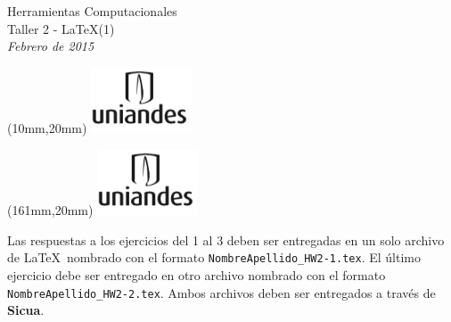 \documentclass[12pt,letterpaper]{exam}
\begin{document}
\begin{center}
{\Large Herramientas Computacionales} \\
Taller 2 - \LaTeX (1) \\
{\small \it Febrero de 2015}
\end{center}

\begin{textblock*}{40mm}(10mm,20mm)
  \includegraphics[width=3cm]{logoUniandes.png}
\end{textblock*}

\begin{textblock*}{40mm}(161mm,20mm)
  \includegraphics[width=3cm]{logoUniandes.png}
\end{textblock*}



Las respuestas a los ejercicios del 1 al 3 deben ser entregadas en un solo archivo de \LaTeX $\,$ nombrado con el formato \verb"NombreApellido_HW2-1.tex". El último ejercicio debe ser entregado en otro archivo nombrado con el formato \verb"NombreApellido_HW2-2.tex". Ambos archivos deben ser entregados a través de {\bf Sicua}.
\end{document}
